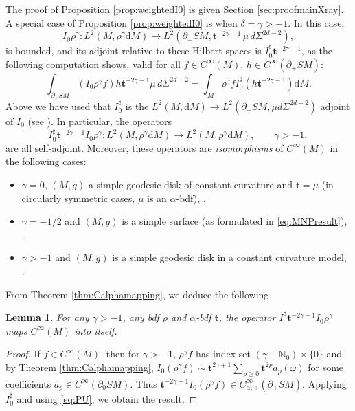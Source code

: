 \documentclass[JEP,XML,SOM,Unicode,NoFloatCountersInSection, NoEqCountersInSection,published]{cedram}
\theoremstyle{plain}
\newtheorem{Lemma}[Theorem]{Lemma}
\theoremstyle{definition}
\theoremstyle{remark}
\def\Nm{{\mathbb{N}}}
\newcommand{\bt}{{\boldsymbol{t}}}
\newcommand{\adj}{I_0^\sharp}
\newcommand {\dM}{\mathrm{d}M}
\begin{document}
The proof of Proposition \ref{prop:weightedI0} is given Section \ref{sec:proofmainXray}. A special case of Proposition \ref{prop:weightedI0} is when $\delta = \gamma > -1$. In this case,
\begin{equation*}
I_0 \rho^{\gamma} \colon L^2(M, \rho^{\gamma}\dM) \to L^2(\partial_+ SM, \bt^{-2\gamma-1} \, \mu \, d\Sigma^{2d-2}),
\end{equation*}
is bounded, and its adjoint relative to these Hilbert spaces is $\adj \bt^{-2\gamma-1}$, as the following computation shows, valid for all $f\in C^\infty(M)$, $h \in C^\infty(\partial_+ SM)$:
\begin{equation*}
\int_{\partial_+ SM} (I_0 \rho^\gamma f) h \bt^{-2\gamma-1} \mu\,d\Sigma^{2d-2} = \int_{M} \rho^\gamma f \adj (h \bt^{-2\gamma-1}) \dM.
\end{equation*}
Above we have used that $I_0^\sharp$ is the $L^2(M,\dM)\to L^2(\partial_+ SM, \mu d\Sigma^{2d-2})$ adjoint of $I_0$ (see \eg \cite[Lem.\,4.1.4]{Paternain2021}). In particular, the operators
\begin{equation*}
\adj \bt^{-2\gamma-1} I_0 \rho^\gamma \colon L^2(M, \rho^{\gamma}\dM) \to L^2(M, \rho^{\gamma}\dM), \qquad \gamma > -1,
\end{equation*}
are all self-adjoint. Moreover, these operators are {\em isomorphisms} of $C^\infty(M)$ in the following cases:
\begin{itemize}
\item $\gamma = 0$, $(M,g)$ a simple geodesic disk of constant curvature and $\bt = \mu$ (in circularly symmetric cases, $\mu$ is an $\alpha$-bdf), \cf \cite{Monard2019a}.
\item $\gamma = -1/2$ and $(M,g)$ is a simple surface (as formulated in \eqref{eq:MNPresult}), \cf \cite{Monard2019}.
\item $\gamma>-1$ and $(M,g)$ is a simple geodesic disk in a constant curvature model, \cf \cite{Mishra2022}.
\end{itemize}

From Theorem \ref{thm:Calphamapping}, we deduce the following
\begin{Lemma}
For any $\gamma>-1$, any bdf $\rho$ and $\alpha$-bdf $\bt$, the operator $\adj \bt^{-2\gamma-1} I_0 \rho^\gamma$ maps $C^\infty(M)$ into itself.
\end{Lemma}
\begin{proof} If $f\in C^\infty(M)$, then for $\gamma>-1$, $\rho^\gamma f$ has index set $(\gamma + \Nm_0)\times \{0\}$ and by
Theorem \ref{thm:Calphamapping}, $I_0 (\rho^\gamma f) \sim \bt^{2\gamma+1} \sum_{p\ge 0} \bt^{2p} a_p(\omega)$ for some coefficients
$a_p\in C^\infty(\partial_0 SM)$. Thus $\bt^{-2\gamma-1} I_0 (\rho^\gamma f)\in C_{\alpha,+}^\infty(\partial_+ SM)$. Applying $\adj$
and using \eqref{eq:PU}, we obtain the result.
\end{proof}
\end{document}
